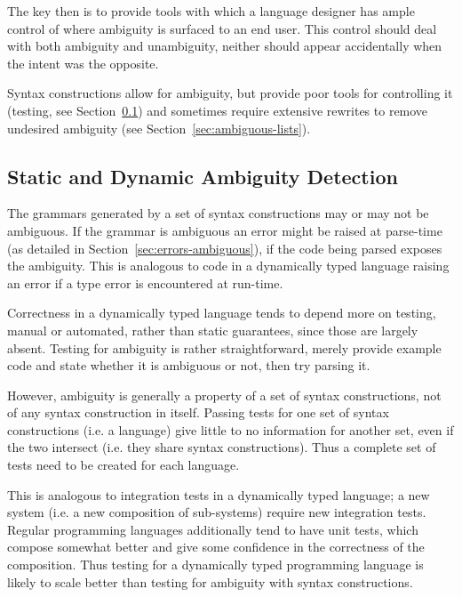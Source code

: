 \documentclass{kththesis}
\begin{document}
The key then is to provide tools with which a language designer has ample control of where ambiguity is surfaced to an end user. This control should deal with both ambiguity and unambiguity, neither should appear accidentally when the intent was the opposite.

Syntax constructions allow for ambiguity, but provide poor tools for controlling it (testing, see Section~\ref{sec:static-dynamic-ambiguity}) and sometimes require extensive rewrites to remove undesired ambiguity (see Section~\ref{sec:ambiguous-lists}).

\subsection{Static and Dynamic Ambiguity Detection} \label{sec:static-dynamic-ambiguity}

The grammars generated by a set of syntax constructions may or may not be ambiguous. If the grammar is ambiguous an error might be raised at parse-time (as detailed in Section~\ref{sec:errors-ambiguous}), if the code being parsed exposes the ambiguity. This is analogous to code in a dynamically typed language raising an error if a type error is encountered at run-time.

Correctness in a dynamically typed language tends to depend more on testing, manual or automated, rather than static guarantees, since those are largely absent. Testing for ambiguity is rather straightforward, merely provide example code and state whether it is ambiguous or not, then try parsing it.

However, ambiguity is generally a property of a set of syntax constructions, not of any syntax construction in itself. Passing tests for one set of syntax constructions (i.e. a language) give little to no information for another set, even if the two intersect (i.e. they share syntax constructions). Thus a complete set of tests need to be created for each language.

This is analogous to integration tests in a dynamically typed language; a new system (i.e. a new composition of sub-systems) require new integration tests. Regular programming languages additionally tend to have unit tests, which compose somewhat better and give some confidence in the correctness of the composition. Thus testing for a dynamically typed programming language is likely to scale better than testing for ambiguity with syntax constructions.
\end{document}
